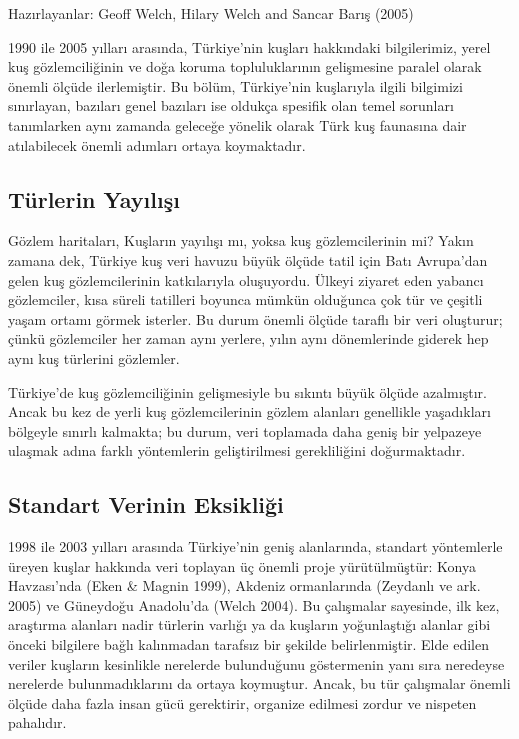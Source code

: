 \documentclass[
  a4paper,
  DIV=11,
  numbers=noendperiod]{scrreprt}
\begin{document}

Hazırlayanlar: Geoff Welch, Hilary Welch and Sancar Barış (2005)

1990 ile 2005 yılları arasında, Türkiye'nin kuşları hakkındaki
bilgilerimiz, yerel kuş gözlemciliğinin ve doğa koruma topluluklarının
gelişmesine paralel olarak önemli ölçüde ilerlemiştir. Bu bölüm,
Türkiye'nin kuşlarıyla ilgili bilgimizi sınırlayan, bazıları genel
bazıları ise oldukça spesifik olan temel sorunları tanımlarken aynı
zamanda geleceğe yönelik olarak Türk kuş faunasına dair atılabilecek
önemli adımları ortaya koymaktadır.

\subsection*{Türlerin
Yayılışı}\label{tuxfcrlerin-yayux131lux131ux15fux131}

Gözlem haritaları, Kuşların yayılışı mı, yoksa kuş gözlemcilerinin mi?
Yakın zamana dek, Türkiye kuş veri havuzu büyük ölçüde tatil için Batı
Avrupa'dan gelen kuş gözlemcilerinin katkılarıyla oluşuyordu. Ülkeyi
ziyaret eden yabancı gözlemciler, kısa süreli tatilleri boyunca mümkün
olduğunca çok tür ve çeşitli yaşam ortamı görmek isterler. Bu durum
önemli ölçüde taraflı bir veri oluşturur; çünkü gözlemciler her zaman
aynı yerlere, yılın aynı dönemlerinde giderek hep aynı kuş türlerini
gözlemler.

Türkiye'de kuş gözlemciliğinin gelişmesiyle bu sıkıntı büyük ölçüde
azalmıştır. Ancak bu kez de yerli kuş gözlemcilerinin gözlem alanları
genellikle yaşadıkları bölgeyle sınırlı kalmakta; bu durum, veri
toplamada daha geniş bir yelpazeye ulaşmak adına farklı yöntemlerin
geliştirilmesi gerekliliğini doğurmaktadır.

\subsection*{Standart Verinin
Eksikliği}\label{standart-verinin-eksikliux11fi}

1998 ile 2003 yılları arasında Türkiye'nin geniş alanlarında, standart
yöntemlerle üreyen kuşlar hakkında veri toplayan üç önemli proje
yürütülmüştür: Konya Havzası'nda (Eken \& Magnin 1999), Akdeniz
ormanlarında (Zeydanlı ve ark. 2005) ve Güneydoğu Anadolu'da (Welch
2004). Bu çalışmalar sayesinde, ilk kez, araştırma alanları nadir
türlerin varlığı ya da kuşların yoğunlaştığı alanlar gibi önceki
bilgilere bağlı kalınmadan tarafsız bir şekilde belirlenmiştir. Elde
edilen veriler kuşların kesinlikle nerelerde bulunduğunu göstermenin
yanı sıra neredeyse nerelerde bulunmadıklarını da ortaya koymuştur.
Ancak, bu tür çalışmalar önemli ölçüde daha fazla insan gücü gerektirir,
organize edilmesi zordur ve nispeten pahalıdır.
\end{document}

